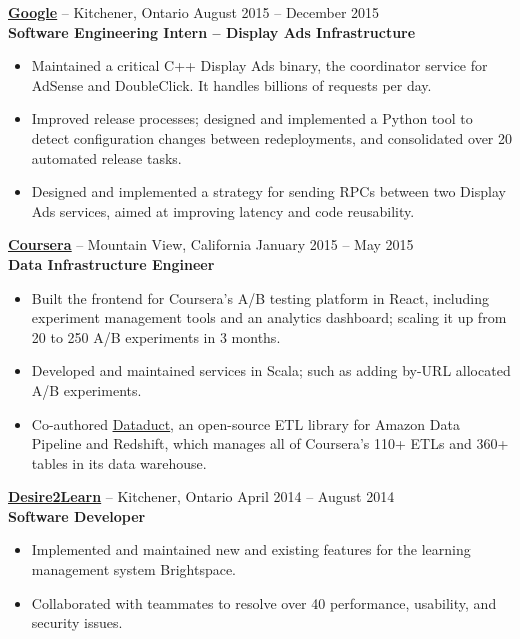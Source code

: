 \documentclass{letter}
\begin{document}
\vspace{-1.5mm}
{\bfseries \href{https://www.google.com}{\uline{Google}}} -- Kitchener, Ontario \hfill August 2015 -- December 2015\\
{\bfseries Software Engineering Intern -- Display Ads Infrastructure}
\vspace{-3mm}
\begin{itemize}
    \item Maintained a critical C++ Display Ads binary, the coordinator service
      for AdSense and DoubleClick. It handles billions of requests per day.
    \item Improved release processes; designed and implemented a Python tool to
        detect configuration changes between redeployments, and consolidated
        over 20 automated release tasks.
    \item Designed and implemented a strategy for sending RPCs between two
      Display Ads services, aimed at improving latency and code reusability.
\end{itemize}

\vspace{-1.5mm}
{\bfseries \href{https://www.coursera.org}{\uline{Coursera}}} -- Mountain View, California \hfill January 2015 -- May 2015 \\
{\bfseries Data Infrastructure Engineer}
\vspace{-3mm}
\begin{itemize}
    \item Built the frontend for Coursera's A/B testing platform in React,
      including experiment management tools and an analytics dashboard; scaling
      it up from 20 to 250 A/B experiments in 3 months.
    \item Developed and maintained services in Scala; such as adding by-URL
      allocated A/B experiments.
    \item Co-authored \href{https://github.com/coursera/dataduct}{\uline{Dataduct}},
      an open-source ETL library for Amazon Data Pipeline and Redshift, which
      manages all of Coursera's 110+ ETLs and 360+ tables in its data warehouse.
\end{itemize}

\vspace{-1.5mm}
{\bfseries \href{http://www.d2l.com}{\uline{Desire2Learn}}} -- Kitchener, Ontario \hfill April 2014 -- August 2014 \\
{\bfseries Software Developer}
\vspace{-3mm}
\begin{itemize}
    \item Implemented and maintained new and existing features for the learning
      management system Brightspace.
    \item Collaborated with teammates to resolve over 40 performance, usability, and security issues.
\end{itemize}
\end{document}
